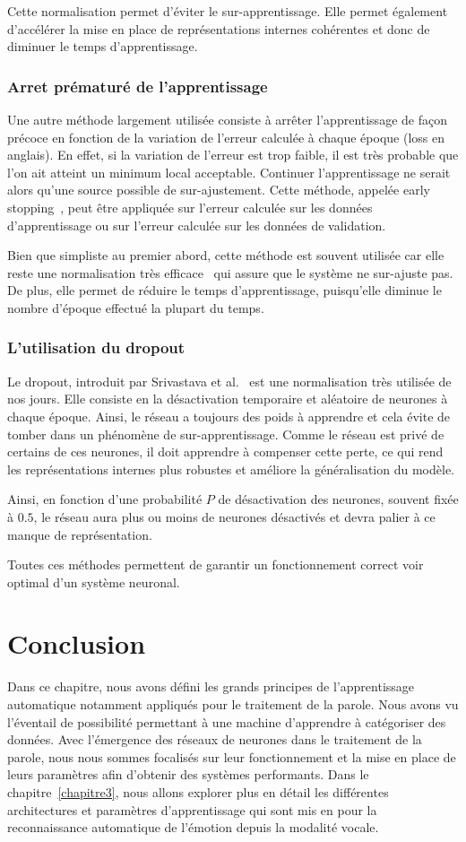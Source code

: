Cette normalisation permet d'éviter le sur-apprentissage. Elle permet également d'accélérer la mise en place de représentations internes cohérentes et donc de diminuer le temps d'apprentissage.

\subsubsection{Arret prématuré de l'apprentissage}
Une autre méthode largement utilisée consiste à arrêter l'apprentissage de façon précoce en fonction de la variation de l'erreur calculée à chaque époque (loss en anglais). En effet, si la variation de l'erreur est trop faible, il est très probable que l'on ait atteint un minimum local acceptable. Continuer l'apprentissage ne serait alors qu'une source possible de sur-ajustement. Cette méthode, appelée early stopping~\cite{Prechelt1998}, peut être appliquée sur l'erreur calculée sur les données d'apprentissage ou sur l'erreur calculée sur les données de validation.

Bien que simpliste au premier abord, cette méthode est souvent utilisée car elle reste une normalisation très efficace~\cite{Finnoff1993} qui assure que le système ne sur-ajuste pas. De plus, elle permet de réduire le temps d'apprentissage, puisqu'elle diminue le nombre d'époque effectué la plupart du temps.

\subsubsection{L'utilisation du dropout}
Le dropout, introduit par Srivastava et al.~\cite{Srivastava2014} est une normalisation très utilisée de nos jours. Elle consiste en la désactivation temporaire et aléatoire de neurones à chaque époque. Ainsi, le réseau a toujours des poids à apprendre et cela évite de tomber dans un phénomène de sur-apprentissage. Comme le réseau est privé de certains de ces neurones, il doit apprendre à compenser cette perte, ce qui rend les représentations internes plus robustes et améliore la généralisation du modèle.

Ainsi, en fonction d'une probabilité $P$ de désactivation des neurones, souvent fixée à $0.5$, le réseau aura plus ou moins de neurones désactivés et devra palier à ce manque de représentation.

Toutes ces méthodes permettent de garantir un fonctionnement correct voir optimal d'un système neuronal.

\section{Conclusion}
Dans ce chapitre, nous avons défini les grands principes de l'apprentissage automatique notamment appliqués pour le traitement de la parole. Nous avons vu l'éventail de possibilité permettant à une machine d'apprendre à catégoriser des données. Avec l'émergence des réseaux de neurones dans le traitement de la parole, nous nous sommes focalisés sur leur fonctionnement et la mise en place de leurs paramètres afin d'obtenir des systèmes performants. Dans le chapitre~\ref{chapitre3}, nous allons explorer plus en détail les différentes architectures et paramètres d'apprentissage qui sont mis en pour la reconnaissance automatique de l'émotion depuis la modalité vocale.
